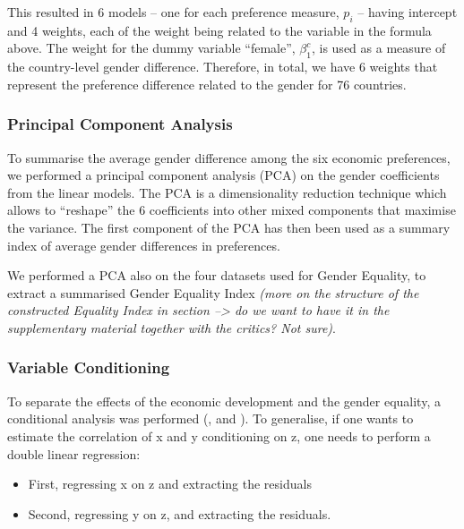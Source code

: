 \documentclass[
  11pt,
]{article}
\begin{document}
This resulted in 6 models -- one for each preference measure, \(p_i\) --
having intercept and 4 weights, each of the weight being related to the
variable in the formula above. The weight for the dummy variable
``female'', \(\beta_1^c\), is used as a measure of the country-level
gender difference. Therefore, in total, we have 6 weights that represent
the preference difference related to the gender for 76 countries.

\hypertarget{principal-component-analysis}{%
\subsubsection{Principal Component
Analysis}\label{principal-component-analysis}}

To summarise the average gender difference among the six economic
preferences, we performed a principal component analysis (PCA) on the
gender coefficients from the linear models. The PCA is a dimensionality
reduction technique which allows to ``reshape'' the 6 coefficients into
other mixed components that maximise the variance. The first component
of the PCA has then been used as a summary index of average gender
differences in preferences.

We performed a PCA also on the four datasets used for Gender Equality,
to extract a summarised Gender Equality Index \emph{(more on the
structure of the constructed Equality Index in section --\textgreater{}
do we want to have it in the supplementary material together with the
critics? Not sure)}.

\hypertarget{variable-conditioning}{%
\subsubsection{Variable Conditioning}\label{variable-conditioning}}

To separate the effects of the economic development and the gender
equality, a conditional analysis was performed (\textcite{FW}, and
\textcite{Lovell}). To generalise, if one wants to estimate the
correlation of x and y conditioning on z, one needs to perform a double
linear regression:

\begin{itemize}
\item
  First, regressing x on z and extracting the residuals
\item
  Second, regressing y on z, and extracting the residuals.
\end{itemize}
\end{document}
